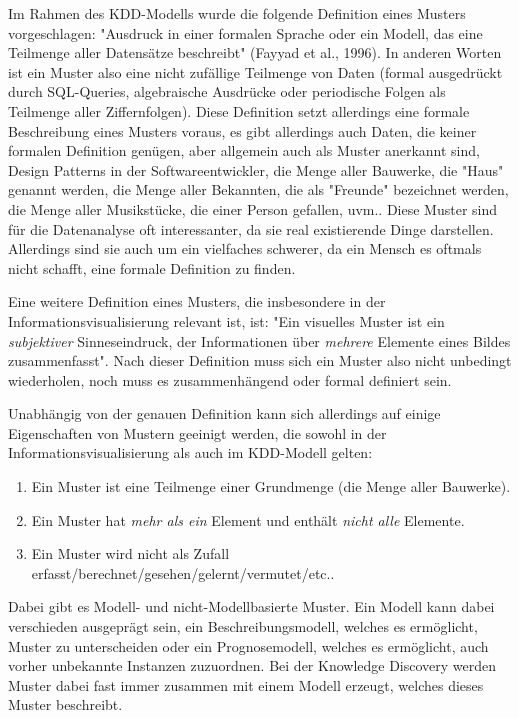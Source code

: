 		Im Rahmen des KDD-Modells wurde die folgende Definition eines Musters vorgeschlagen: "Ausdruck in einer formalen Sprache oder ein Modell, das eine Teilmenge aller Datensätze beschreibt" (Fayyad et al., 1996). In anderen Worten ist ein Muster also eine nicht zufällige Teilmenge von Daten (\zB formal ausgedrückt durch SQL-Queries, algebraische Ausdrücke oder periodische Folgen als Teilmenge aller Ziffernfolgen). Diese Definition setzt allerdings eine formale Beschreibung eines Musters voraus, es gibt allerdings auch Daten, die keiner formalen Definition genügen, aber allgemein auch als Muster anerkannt sind, \zB Design Patterns in der Softwareentwickler, die Menge aller Bauwerke, die "Haus" genannt werden, die Menge aller Bekannten, die als "Freunde" bezeichnet werden, die Menge aller Musikstücke, die einer Person gefallen, uvm.. Diese Muster sind für die Datenanalyse oft interessanter, da sie real existierende Dinge darstellen. Allerdings sind sie auch um ein vielfaches schwerer, da ein Mensch es oftmals nicht schafft, eine formale Definition zu finden.

		Eine weitere Definition eines Musters, die insbesondere in der Informationsvisualisierung relevant ist, ist: "Ein visuelles Muster ist ein \emph{subjektiver} Sinneseindruck, der Informationen über \emph{mehrere} Elemente eines Bildes zusammenfasst". Nach dieser Definition muss sich ein Muster also nicht unbedingt wiederholen, noch muss es zusammenhängend oder formal definiert sein.

		Unabhängig von der genauen Definition kann sich allerdings auf einige Eigenschaften von Mustern geeinigt werden, die sowohl in der Informationsvisualisierung als auch im KDD-Modell gelten:
		\begin{enumerate}
			\item Ein Muster ist eine Teilmenge einer Grundmenge (\zB die Menge aller Bauwerke).
			\item Ein Muster hat \emph{mehr als ein} Element und enthält \emph{nicht alle} Elemente.
			\item Ein Muster wird nicht als Zufall erfasst/berechnet/gesehen/gelernt/vermutet/etc..
		\end{enumerate}
		Dabei gibt es Modell- und nicht-Modellbasierte Muster. Ein Modell kann dabei verschieden ausgeprägt sein, \bspw ein Beschreibungsmodell, welches es ermöglicht, Muster zu unterscheiden oder ein Prognosemodell, welches es ermöglicht, auch vorher unbekannte Instanzen zuzuordnen. Bei der Knowledge Discovery werden Muster dabei fast immer zusammen mit einem Modell erzeugt, welches dieses Muster beschreibt.

